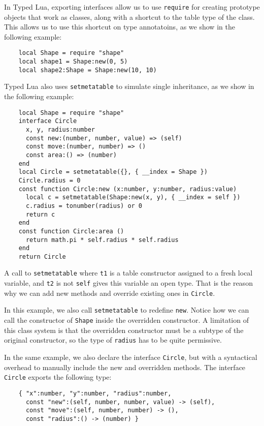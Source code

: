 In Typed Lua, exporting interfaces allow us to use \texttt{require}
for creating prototype objects that work as classes,
along with a shortcut to the table type of the class.
This allows us to use this shortcut on type annotatoins,
as we show in the following example:
\begin{verbatim}
    local Shape = require "shape"
    local shape1 = Shape:new(0, 5)
    local shape2:Shape = Shape:new(10, 10)
\end{verbatim}

Typed Lua also uses \texttt{setmetatable} to simulate single inheritance,
as we show in the following example:

\begin{verbatim}
    local Shape = require "shape"
    interface Circle
      x, y, radius:number
      const new:(number, number, value) => (self)
      const move:(number, number) => ()
      const area:() => (number)
    end
    local Circle = setmetatable({}, { __index = Shape })
    Circle.radius = 0
    const function Circle:new (x:number, y:number, radius:value)
      local c = setmetatable(Shape:new(x, y), { __index = self })
      c.radius = tonumber(radius) or 0
      return c
    end
    const function Circle:area ()
      return math.pi * self.radius * self.radius
    end
    return Circle
\end{verbatim}

A call to \texttt{setmetatable} where \texttt{t1} is a table
constructor assigned to a fresh local variable, and \texttt{t2}
is not \texttt{self} gives this variable an open type.
That is the reason why we can add new methods and override
existing ones in \texttt{Circle}.

In this example, we also call \texttt{setmetatable} to redefine \texttt{new}.
Notice how we can call the constructor of \texttt{Shape} inside
the overridden constructor.
A limitation of this class system is that the overridden constructor
must be a subtype of the original constructor,
so the type of \texttt{radius} has to be quite permissive.

In the same example, we also declare the interface \texttt{Circle},
but with a syntactical overhead to manually include the new and
overridden methods.
The interface \texttt{Circle} exports the following type:
\begin{verbatim}
    { "x":number, "y":number, "radius":number,
      const "new":(self, number, number, value) -> (self),
      const "move":(self, number, number) -> (),
      const "radius":() -> (number) }
\end{verbatim}

